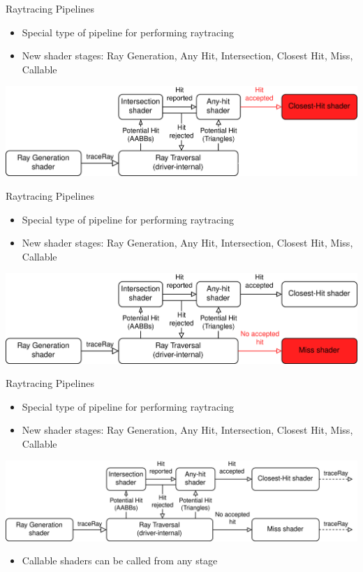 \documentclass[aspectratio=169,t]{beamer}
\begin{document}
\begin{slide}{Raytracing Pipelines}
    \begin{itemize}
     \item Special type of pipeline for performing raytracing
     \item New shader stages: Ray Generation, Any Hit, Intersection, Closest Hit, Miss, Callable
    \end{itemize}
    \includegraphics[width=0.95\linewidth]{graphics/RTStages7.png}
\end{slide}

\begin{slide}{Raytracing Pipelines}
    \begin{itemize}
     \item Special type of pipeline for performing raytracing
     \item New shader stages: Ray Generation, Any Hit, Intersection, Closest Hit, Miss, Callable
    \end{itemize}
    \includegraphics[width=0.95\linewidth]{graphics/RTStages8.png}
\end{slide}

\begin{slide}{Raytracing Pipelines}
    \begin{itemize}
     \item Special type of pipeline for performing raytracing
     \item New shader stages: Ray Generation, Any Hit, Intersection, Closest Hit, Miss, Callable
    \end{itemize}
    \includegraphics[width=1.0651\linewidth]{./graphics/RTStages9.png}
    \pause
    \begin{itemize}
    \item Callable shaders can be called from any stage
    \end{itemize}
\end{slide}
\end{document}
